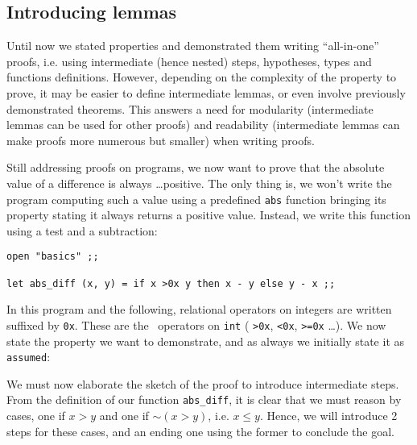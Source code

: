 \documentclass[11pt,a4paper,twoside,onecolumn,fullpage]{article}
\begin{document}
{\scriptsize
}


\subsection{Introducing lemmas}
Until now we stated properties and demonstrated them writing
``all-in-one'' proofs, i.e. using intermediate (hence nested) steps,
hypotheses, types and functions definitions. However, depending on the
complexity of the property to prove, it may be easier to define
intermediate lemmas, or even involve previously demonstrated
theorems. This answers a need for modularity (intermediate lemmas can
be used for other proofs) and readability (intermediate lemmas can
make proofs more numerous but smaller) when writing proofs.

\medskip
Still addressing proofs on programs, we now want to prove that the
absolute value of a difference is always \ldots positive. The only
thing is, we won't write the program computing such a value using a
predefined {\tt abs} function bringing its property stating it always
returns a positive value. Instead, we write this function using a test
and a subtraction:

{\scriptsize
\begin{lstlisting}[caption=lemmas.fcl]
open "basics" ;;

let abs_diff (x, y) = if x >0x y then x - y else y - x ;;
\end{lstlisting}}

In this program and the following, relational operators on integers
are written suffixed by \lstinline{0x}. These are the \focal\
operators on \lstinline{int} ( \lstinline{>0x}, \lstinline{<0x},
\lstinline{>=0x} \ldots). We now state the property we want to
demonstrate, and as always we initially state it as \lstinline{assumed}:

{\scriptsize
}

We must now elaborate the sketch of the proof to introduce
intermediate steps. From the definition of our function
\lstinline"abs_diff", it is clear that we must reason by cases, one if
$x > y$ and one if $\sim (x > y)$, i.e. $x \le y$. Hence, we will
introduce 2 steps for these cases, and an ending one using the former
to conclude the goal.

{\scriptsize
}
\end{document}
